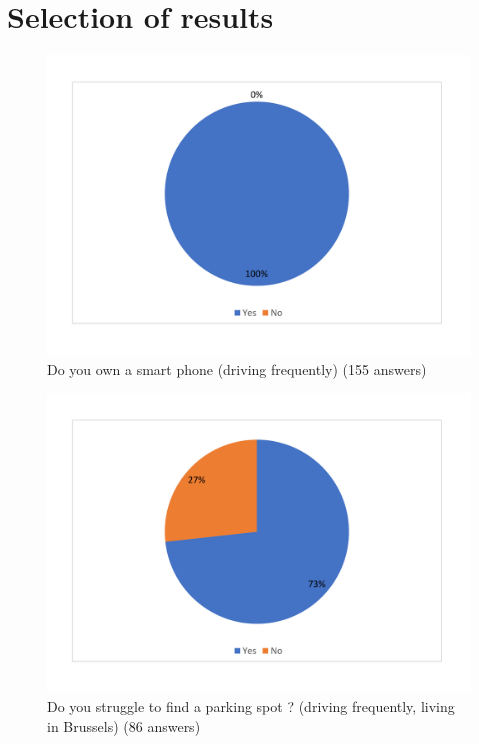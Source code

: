 \documentclass[12pt,a4paper,oneside]{book}
\begin{document}
\section{Selection of results}

\begin{figure}[h]
\centering
\caption{Do you own a smart phone (driving frequently) (155 answers)}
\label{drivesmartres}
\includegraphics[keepaspectratio=true,width=\textwidth-4cm]{../graph/drivesmart.pdf}
\end{figure}

\begin{figure}[h]
\centering
\caption{Do you struggle to find a parking spot ? (driving frequently, living in Brussels) (86 answers)}
\label{struggleres}
\includegraphics[keepaspectratio=true,width=\textwidth-4cm]{../graph/struggle.pdf}
\end{figure}
\end{document}
